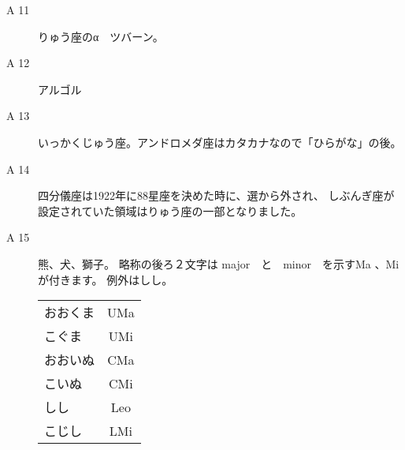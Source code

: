 \documentclass[fleqn]{article}
\renewcommand{\arraystretch}{2.4}
\begin{document}
\begin{description}
{\begin{minipage}{6cm}
\begin{picture}
\end{picture}
\end{minipage}




}
\item[A 11]{ りゅう座のα　ツバーン。}
\item[A 12]{アルゴル}
\item[A 13]{いっかくじゅう座。アンドロメダ座はカタカナなので「ひらがな」の後。
}
\item[A 14]{
四分儀座は1922年に88星座を決めた時に、選から外され、
しぶんぎ座が設定されていた領域はりゅう座の一部となりました。
}


\item[A 15]{熊、犬、獅子。
略称の後ろ２文字は major　と　minor　を示すMa 、Miが付きます。
例外はしし。

{\renewcommand\arraystretch{1.2}
\begin{tabular}{lc}
おおくま&UMa\\
こぐま&UMi\\
おおいぬ&CMa\\
こいぬ&CMi\\
しし&Leo\\
こじし&LMi\\
\end{tabular}
}%

}





\end{description}
\end{document}
